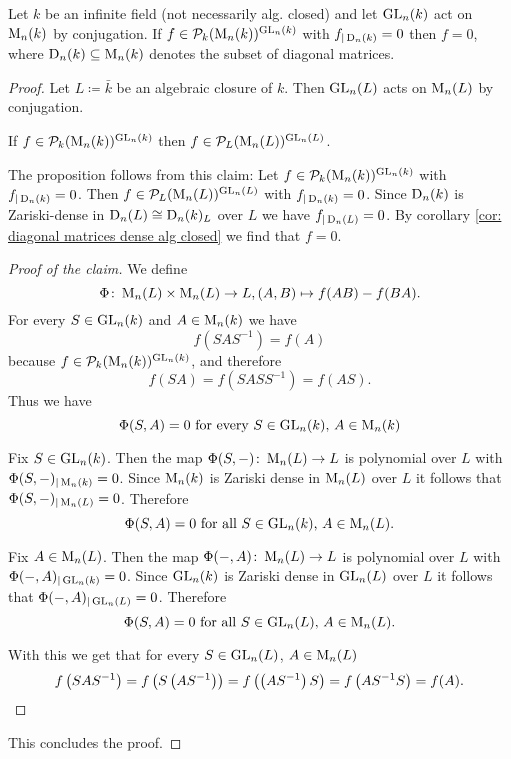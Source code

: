 \begin{prop}
  Let $k$ be an infinite field (not necessarily alg. closed) and let $\operatorname{GL}_n(k)$ act on $\operatorname{M}_n(k)$ by conjugation. If $f \in \mathcal{P}_k(\operatorname{M}_n(k))^{\operatorname{GL}_n(k)}$ with $f_{|\operatorname{D}_n(k)} = 0$ then $f = 0$, where $\operatorname{D}_n(k) \subseteq \operatorname{M}_n(k)$ denotes the subset of diagonal matrices.
\end{prop}
\begin{proof}
  Let $L \coloneqq \bar{k}$ be an algebraic closure of $k$. Then $\operatorname{GL}_n(L)$ acts on $\operatorname{M}_n(L)$ by conjugation.
  
  \begin{claim}
    If $f \in \mathcal{P}_k(\operatorname{M}_n(k))^{\operatorname{GL}_n(k)}$ then $f \in \mathcal{P}_L(\operatorname{M}_n(L))^{\operatorname{GL}_n(L)}$.
  \end{claim}
  
  The proposition follows from this claim: Let $f \in \mathcal{P}_k(\operatorname{M}_n(k))^{\operatorname{GL}_n(k)}$ with $f_{|\operatorname{D}_n(k)} = 0$. Then $f \in \mathcal{P}_L(\operatorname{M}_n(L))^{\operatorname{GL}_n(L)}$ with $f_{|\operatorname{D}_n(k)} = 0$. Since $\operatorname{D}_n(k)$ is Zariski-dense in $\operatorname{D}_n(L) \cong \operatorname{D}_n(k)_L$ over $L$ we have $f_{|\operatorname{D}_n(L)} = 0$. By corollary \ref{cor: diagonal matrices dense alg closed} we find that $f = 0$.
  
  \begin{proof}[Proof of the claim]
    We define
    \[
      \Phi \colon \operatorname{M}_n(L) \times \operatorname{M}_n(L) \to L, (A,B) \mapsto f(AB)-f(BA).
    \]
    For every $S \in \operatorname{GL}_n(k)$ and $A \in \operatorname{M}_n(k)$ we have
    \[
      f\left( SAS^{-1} \right) = f(A)
    \]
    because $f \in \mathcal{P}_k(\operatorname{M}_n(k))^{\operatorname{GL}_n(k)}$, and therefore
    \[
      f(SA) = f\left(SASS^{-1}\right) = f(AS).
    \]
    Thus we have
    \[
      \Phi(S,A) = 0 \text{ for every } S \in \operatorname{GL}_n(k)\text{, }A \in \operatorname{M}_n(k)
    \]
    
    Fix $S \in \operatorname{GL}_n(k)$. Then the map $\Phi(S, -) \colon \operatorname{M}_n(L) \to L$ is polynomial over $L$ with $\Phi(S,-)_{|\operatorname{M}_n(k)} = 0$. Since $\operatorname{M}_n(k)$ is Zariski dense in $\operatorname{M}_n(L)$ over $L$ it follows that $\Phi(S,-)_{|\operatorname{M}_n(L)} = 0$. Therefore
    \[
      \Phi(S,A) = 0 \text{ for all } S \in \operatorname{GL}_n(k)\text{, }A \in \operatorname{M}_n(L).
    \]
    
    Fix $A \in \operatorname{M}_n(L)$. Then the map $\Phi(-,A) \colon \operatorname{M}_n(L) \to L$ is polynomial over $L$ with $\Phi(-,A)_{|\operatorname{GL}_n(k)} = 0$. Since $\operatorname{GL}_n(k)$ is Zariski dense in $\operatorname{GL}_n(L)$ over $L$ it follows that $\Phi(-,A)_{|\operatorname{GL}_n(L)} = 0$. Therefore
    \[
      \Phi(S,A) = 0 \text{ for all } S \in \operatorname{GL}_n(L)\text{, }A \in \operatorname{M}_n(L).
    \]
    
    With this we get that for every $S \in \operatorname{GL}_n(L)$, $A \in \operatorname{M}_n(L)$
    \[
      f\left(SAS^{-1}\right)
      = f\left(S\left(AS^{-1}\right)\right)
      = f\left(\left(AS^{-1}\right)S\right)
      = f\left(AS^{-1}S\right)
      = f(A).
      \qedhere
    \]
  \end{proof}
  
  This concludes the proof.
\end{proof}





